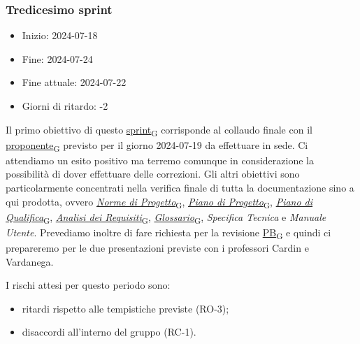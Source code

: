 \newpage
\subsubsection{Tredicesimo sprint}
\begin{itemize}
    \item Inizio: 2024-07-18
    \item Fine: 2024-07-24
    \item Fine attuale: 2024-07-22
    \item Giorni di ritardo: -2
\end{itemize}

Il primo obiettivo di questo \href{https://7last.github.io/docs/pb/documentazione-interna/glossario\#sprint}{sprint\textsubscript{G}} corrisponde al collaudo finale con il \href{https://7last.github.io/docs/pb/documentazione-interna/glossario\#proponente}{proponente\textsubscript{G}} previsto per il giorno 2024-07-19 da effettuare in sede. Ci attendiamo un esito positivo ma terremo comunque in considerazione la possibilità di dover effettuare delle correzioni. Gli altri obiettivi sono particolarmente concentrati nella verifica finale di tutta la documentazione sino a qui prodotta, ovvero \href{https://7last.github.io/docs/pb/documentazione-interna/glossario\#norme-di-progetto}{\textit{Norme di Progetto}\textsubscript{G}}, \href{https://7last.github.io/docs/pb/documentazione-interna/glossario\#piano-di-progetto}{\textit{Piano di Progetto}\textsubscript{G}}, \href{https://7last.github.io/docs/pb/documentazione-interna/glossario\#piano-di-qualifica}{\textit{Piano di Qualifica}\textsubscript{G}}, \href{https://7last.github.io/docs/pb/documentazione-interna/glossario\#analisi-dei-requisiti}{\textit{Analisi dei Requisiti}\textsubscript{G}}, \href{https://7last.github.io/docs/pb/documentazione-interna/glossario\#glossario}{\textit{Glossario}\textsubscript{G}}, \textit{Specifica Tecnica} e \textit{Manuale Utente}. Prevediamo inoltre di fare richiesta per la revisione \href{https://7last.github.io/docs/pb/documentazione-interna/glossario\#product-baseline}{PB\textsubscript{G}} e quindi ci prepareremo per le due presentazioni previste con i professori Cardin e Vardanega.

I rischi attesi per questo periodo sono:
\begin{itemize}
	\item ritardi rispetto alle tempistiche previste (RO-3);
    \item disaccordi all'interno del gruppo (RC-1).
\end{itemize}

